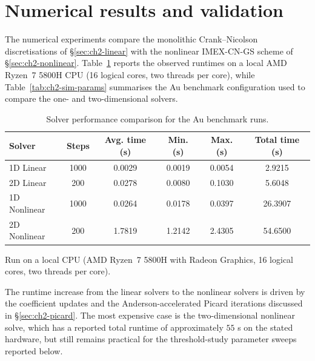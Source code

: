 \section{Numerical results and validation}
\label{sec:ch2-results}

The numerical experiments compare the monolithic Crank--Nicolson discretisations of \S\ref{sec:ch2-linear} with the nonlinear IMEX-CN-GS scheme of \S\ref{sec:ch2-nonlinear}. Table~\ref{tab:ch2-performance} reports the observed runtimes on a local AMD Ryzen~7 5800H CPU (16 logical cores, two threads per core), while Table~\ref{tab:ch2-sim-params} summarises the Au benchmark configuration used to compare the one- and two-dimensional solvers.

\begin{table}[htbp]
    \centering
    \caption{Solver performance comparison for the Au benchmark runs.}
    \label{tab:ch2-performance}
    \begin{tabular}{@{}lccccc@{}}
        \toprule
        Solver       & Steps & Avg. time (s) & Min. (s) & Max. (s) & Total time (s) \\
        \midrule
        1D Linear    & 1000  & 0.0029        & 0.0019   & 0.0054   & 2.9215         \\
        2D Linear    & 200   & 0.0278        & 0.0080   & 0.1030   & 5.6048         \\
        1D Nonlinear & 1000  & 0.0264        & 0.0178   & 0.0397   & 26.3907        \\
        2D Nonlinear & 200   & 1.7819        & 1.2142   & 2.4305   & 54.6500        \\
        \bottomrule
    \end{tabular}

    \vspace{1mm}
    \parbox{0.94\linewidth}{\footnotesize Run on a local CPU (AMD Ryzen~7 5800H with Radeon Graphics, 16 logical cores, two threads per core).}
\end{table}

The runtime increase from the linear solvers to the nonlinear solvers is driven by the coefficient updates and the Anderson-accelerated Picard iterations discussed in \S\ref{sec:ch2-picard}. The most expensive case is the two-dimensional nonlinear solve, which has a reported total runtime of approximately \(55\) s on the stated hardware, but still remains practical for the threshold-study parameter sweeps reported below.

